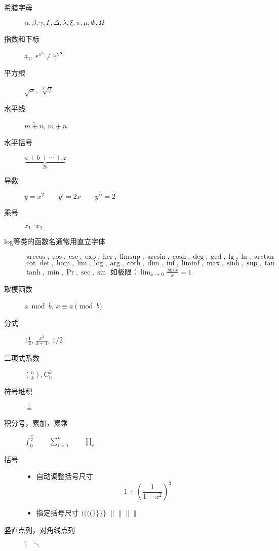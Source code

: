 \documentclass[a4paper,12pt]{article}
\begin{document}
\begin{description}
\item[希腊字母]
$\alpha, \beta, \gamma, \Gamma, \Delta, \lambda, \xi, \pi, \mu, \Phi, \Omega$

\item[指数和下标]$a_{1}$, $e^{x^2}\neq {e^x}^2$

\item[平方根] $\sqrt{x}$, $\sqrt[3]{2}$ 

\item[水平线]$\overline{m+n}$, $\underline{m+n}$

\item[水平括号] $\underbrace{a+b+\cdots+z}_{26}$

\item[导数]$y=x^{2}\qquad y’=2x\qquad y’’=2$

\item[乘号]$x_{1}\cdot x_{2}$

\item[log等类的函数名通常用直立字体]
\begin{flushleft}$\arccos, \cos, \csc, \exp, \ker, \limsup,\arcsin, \cosh, \deg, \gcd, \lg, \ln, \arctan$\\$ \cot \det, \hom, \lim, \log,
\arg, \coth, \dim, \inf, \liminf, \max, \sinh, \sup, \tan$\\$ \tanh, \min, \Pr,
\sec, \sin$ 如极限：$\lim_{x \rightarrow 0}\frac{\sin x}{x}=1$
\end{flushleft}

\item[取模函数]$a\bmod b$, $x\equiv a \pmod{b}$

\item[分式]$1\frac{1}{2}$, $\frac{x^2}{k+1}$, $1/2$

\item[二项式系数]$\binom{n}{k},\mathrm{C}_n^k$

\item[符号堆积]$\stackrel{!}{=}$

\item[积分号，累加，累乘]$\int_{0}^{\frac{\pi}{2}} \qquad \sum_{i=1}^{n} \qquad \prod_\epsilon$

\item[括号]
\begin{itemize}
\item 自动调整括号尺寸 
\begin{displaymath}
1 + \left( \frac{1}{ 1-x^{2} }
\right) ^3
\end{displaymath}
\item 指定括号尺寸
$\big(\Big(\bigg(\Bigg($\quad$\big\}\Big\}\bigg\}\Bigg\}$\quad
$\big\|\Big\|\bigg\|\Bigg\|$
\end{itemize}

\item[竖直点列，对角线点列]$\vdots\quad \ddots$
\end{description}
\end{document}
